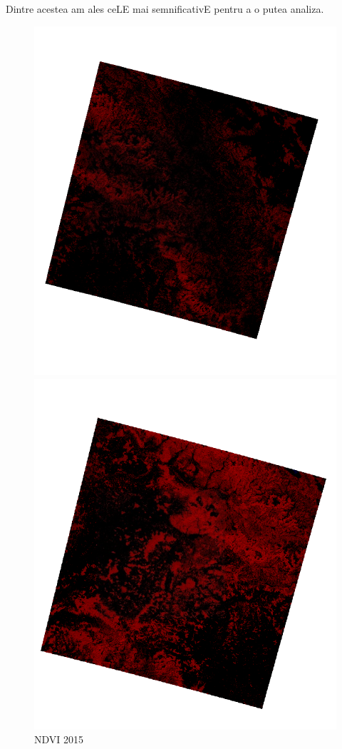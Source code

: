 \documentclass[12pt,a4paper]{article}
\theoremstyle{definition}
\theoremstyle{remark}
\begin{document}
Dintre acestea am ales ceLE mai semnificativE pentru a o putea analiza.

\begin{figure}[!htb]
   \begin{minipage}{0.48\textwidth}
     \centering
     \includegraphics[width=1\linewidth]{ndvinou3.png}
     \caption{NDVI 2015}
   \end{minipage}\hfill
   \begin{minipage}{0.48\textwidth}
     \centering
     \includegraphics[width=1\linewidth]{ndvinou.png}

\end{minipage}
\end{figure}
\end{document}
